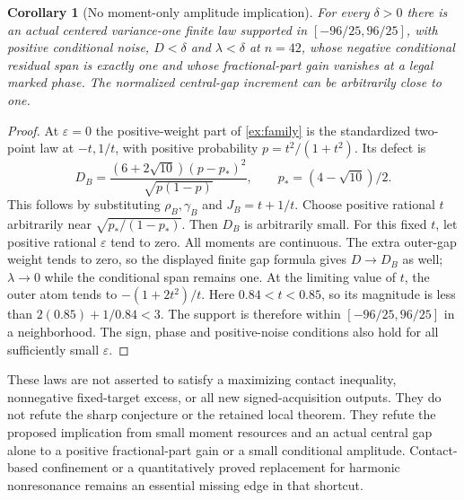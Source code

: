 \documentclass[11pt]{article}
\newtheorem{corollary}[lemma]{Corollary}
\begin{document}
\begin{corollary}[No moment-only amplitude implication]\label{ex:arbitrary}
For every $\delta>0$ there is an actual centered variance-one finite law
supported in $[-96/25,96/25]$, with positive conditional noise,
$D<\delta$ and $\lambda<\delta$ at $n=42$, whose negative conditional
residual span is exactly one and whose fractional-part gain vanishes
at a legal marked phase. The normalized central-gap increment can be
arbitrarily close to one.
\end{corollary}
\begin{proof}
At $\varepsilon=0$ the positive-weight part of \eqref{ex:family} is
the standardized two-point law at $-t,1/t$, with positive probability
$p=t^2/(1+t^2)$. Its defect is
\[
 D_B=\frac{(6+2\sqrt{10})(p-p_*)^2}{\sqrt{p(1-p)}},
 \qquad p_*=(4-\sqrt{10})/2.
\]
This follows by substituting $\rho_B,\gamma_B$ and $J_B=t+1/t$.
Choose positive rational $t$ arbitrarily near
$\sqrt{p_*/(1-p_*)}$. Then $D_B$ is arbitrarily small.
For this fixed $t$, let positive rational $\varepsilon$ tend to zero.
All moments are continuous. The extra outer-gap weight tends to zero,
so the displayed finite gap formula gives $D\to D_B$ as well;
$\lambda\to0$ while the conditional span remains one.
At the limiting value of $t$, the outer atom tends to
$-(1+2t^2)/t$. Here $0.84<t<0.85$, so its magnitude is less than
$2(0.85)+1/0.84<3$. The support is therefore within
$[-96/25,96/25]$ in a neighborhood. The sign, phase and positive-noise
conditions also hold for all sufficiently small $\varepsilon$.
\end{proof}

These laws are not asserted to satisfy a maximizing contact inequality,
nonnegative fixed-target excess, or all new signed-acquisition outputs.
They do not refute the sharp conjecture or the retained local theorem.
They refute the proposed implication from small moment resources and an
actual central gap alone to a positive fractional-part gain or a small
conditional amplitude. Contact-based confinement or a quantitatively
proved replacement for harmonic nonresonance remains an essential missing
edge in that shortcut.
\end{document}

